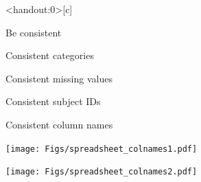 \documentclass[aspectratio=169,12pt,t]{beamer}
\begin{document}
{
\color{background}

\begin{frame}<handout:0>[c]{}

  \addtocounter{framenumber}{-1}

  \centering
  \fontsize{66pt}{66}\selectfont

  Be consistent

\end{frame}
}


\begin{frame}[c]{Consistent categories}


  \note{

  }

\end{frame}



\begin{frame}[c]{Consistent missing values}


  \note{

  }

\end{frame}



\begin{frame}[c]{Consistent subject IDs}


  \note{

  }

\end{frame}




\begin{frame}{Consistent column names}

\texttt{[image: Figs/spreadsheet\_colnames1.pdf]}

\vspace*{-0.6\textheight}
\hspace*{0.1\textwidth}
\texttt{[image: Figs/spreadsheet\_colnames2.pdf]}

  \note{

  }

\end{frame}
\end{document}
